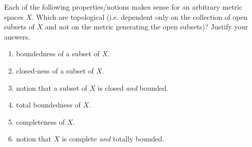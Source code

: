 Each of the following properties/notions makes sense for an arbitrary metric spaces $X$. Which are topological (i.e. dependent only on the collection of open subsets of $X$ and not on the metric generating the open subsets)? Justify your answers.

\begin{enumerate}
\item[(i)] boundedness of a subset of $X$.
\item[(ii)] closed-ness of a subset of $X$.
\item[(iii)] notion that a subset of $X$ is closed \emph{and} bounded.
\item[(iv)] total boundedness of $X$.
\item[(v)] completeness of $X$.
\item[(vi)] notion that $X$ is complete \emph{and} totally bounded.
\end{enumerate}
